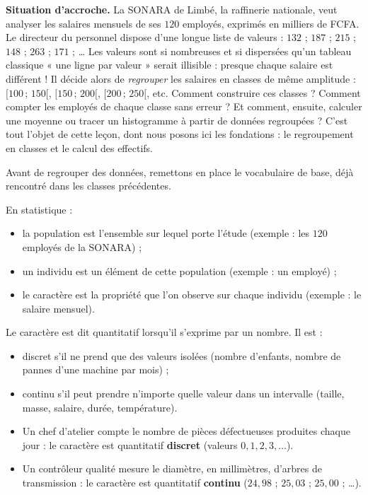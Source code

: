 \documentclass[11pt]{article}
\newcommand{\cle}[1]{{\popxbold\color{popdark}#1}}
\newcounter{popsec}
\newcounter{popsub}
\newcommand{\courssub}[1]{%
  \stepcounter{popsub}%
  \par\vspace{9pt}\noindent{\popxbold\fontsize{11.5}{13}\selectfont\color{popink}{\color{poporange}\thepopsec.\thepopsub}\hspace{6pt}#1}\par\nopagebreak\vspace{4pt}
}
\begin{document}
\textbf{Situation d'accroche.} La SONARA de Limbé, la raffinerie nationale, veut analyser les salaires mensuels de ses $120$ employés, exprimés en milliers de FCFA. Le directeur du personnel dispose d'une longue liste de valeurs : $132$ ; $187$ ; $215$ ; $148$ ; $263$ ; $171$ ; \dots{} Les valeurs sont si nombreuses et si dispersées qu'un tableau classique « une ligne par valeur » serait illisible : presque chaque salaire est différent ! Il décide alors de \emph{regrouper} les salaires en \cle{classes} de même amplitude : $[100\,;\,150[$, $[150\,;\,200[$, $[200\,;\,250[$, etc. Comment construire ces classes ? Comment compter les employés de chaque classe sans erreur ? Et comment, ensuite, calculer une moyenne ou tracer un histogramme à partir de données regroupées ? C'est tout l'objet de cette leçon, dont nous posons ici les fondations : le regroupement en classes et le calcul des effectifs.

\courssub{Rappels de vocabulaire statistique}

Avant de regrouper des données, remettons en place le vocabulaire de base, déjà rencontré dans les classes précédentes.

\begin{definition}
En statistique :
\begin{itemize}
\item la \cle{population} est l'ensemble sur lequel porte l'étude (exemple : les $120$ employés de la SONARA) ;
\item un \cle{individu} est un élément de cette population (exemple : un employé) ;
\item le \cle{caractère} est la propriété que l'on observe sur chaque individu (exemple : le salaire mensuel).
\end{itemize}
Le caractère est dit \cle{quantitatif} lorsqu'il s'exprime par un nombre. Il est :
\begin{itemize}
\item \cle{discret} s'il ne prend que des valeurs isolées (nombre d'enfants, nombre de pannes d'une machine par mois) ;
\item \cle{continu} s'il peut prendre n'importe quelle valeur dans un intervalle (taille, masse, salaire, durée, température).
\end{itemize}
\end{definition}

\begin{exemplebox}
\begin{itemize}
\item Un chef d'atelier compte le nombre de pièces défectueuses produites chaque jour : le caractère est quantitatif \textbf{discret} (valeurs $0, 1, 2, 3, \dots$).
\item Un contrôleur qualité mesure le diamètre, en millimètres, d'arbres de transmission : le caractère est quantitatif \textbf{continu} ($24{,}98$ ; $25{,}03$ ; $25{,}00$ ; \dots).
\end{itemize}
\end{exemplebox}
\end{document}
